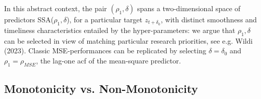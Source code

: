 \documentclass[a4paper]{article}
\begin{document}
In this abstract context, the pair $(\rho_1,\delta)$ spans a two-dimensional space of predictors SSA($\rho_1,\delta$), for a particular target $z_{t+\delta_0}$, with distinct smoothness and timeliness characteristics entailed by the hyper-parameters: we argue that $\rho_1,\delta$ can be selected in view of matching particular research priorities, see e.g. Wildi (2023). Classic MSE-performances can be replicated by selecting $\delta=\delta_0$ and $\rho_1=\rho_{MSE}$, the lag-one acf of the mean-square predictor. 



\subsection{Monotonicity vs. Non-Monotonicity}\label{mon_non_mono}
\end{document}
